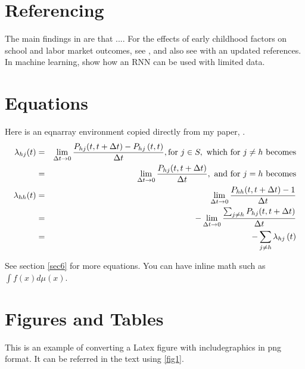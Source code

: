 \documentclass[12pt,svgnames]{article}
\begin{document}
\section {Referencing}\label{sec2}
The main findings in \citep{Aalen.etal_2008_Book,Kanherkar.etal_2014} are that .... For the effects of early childhood factors on school and labor market outcomes, see \cite{Heckman.Raut_2016}, and also see \cite{Raut_2018} with an updated references. In machine learning, \cite{Altae-Tran_2016,Altae-Tran.etal_2017} show how an RNN can be used with limited data. 

\section{Equations}\label{sec3}

Here is an eqnarray environment copied directly from my paper, \cite{Raut_2019}. 
\begin{eqnarray}
\lambda _{hj}(t) &=&\lim_{\Delta t\rightarrow 0}\frac{P_{hj}(t,t+\Delta
t)-P_{hj}\left( t,t\right) }{\Delta t},\text{for }j\in S,\text{ which for }%
j\neq h\text{ becomes}  \notag \\
&=&\lim_{\Delta t\rightarrow 0}\frac{P_{hj}(t,t+\Delta t)}{\Delta t},\text{
and for }j=h\text{ becomes}  \notag \\
\lambda _{hh}(t) &=&\lim_{\Delta t\rightarrow 0}\frac{P_{hh}(t,t+\Delta t)-1%
}{\Delta t}  \label{eq3} \\
&=&-\lim_{\Delta t\rightarrow 0}\frac{\sum_{j\neq h}P_{hj}(t,t+\Delta t)}{%
\Delta t}  \notag \\
&=&-\sum_{j\neq h}\lambda _{hj}\left( t\right)   \notag
\end{eqnarray}%

See section \ref{sec6} for more equations.  You can have inline math such as $\int f(x) d\mu(x)$. 

\section{Figures and Tables} \label{sec4}

This is an example of converting a Latex figure with includegraphics in png format. It can be referred in the text using \autoref{fig1}.
 
\end{document}
